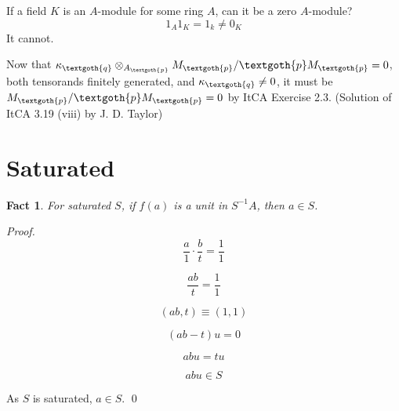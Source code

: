 \documentclass{article}
\newtheorem{theorem}{Fact}[section]
\begin{document}
If a field $K$ is an $A$-module for some ring $A$, can it be a zero $A$-module?
\[
 1_A 1_K = 1_k \ne 0_K
\]
It cannot.

Now that $\kappa_\textgoth{q} \otimes_{A_\textgoth{p}} M_\textgoth{p}/\textgoth{p}M_\textgoth{p} = 0$, both tensorands finitely generated, and $\kappa_\textgoth{q} \ne 0$, it must be $M_\textgoth{p}/\textgoth{p}M_\textgoth{p} = 0$ by ItCA Exercise 2.3. (Solution of ItCA 3.19 (viii) by J. D. Taylor)


\section{Saturated}

\begin{theorem}
For saturated $S$, if $f(a)$ is a unit in $S^{-1}A$, then $a \in S$.
\end{theorem}

\noindent
\textit{Proof.}
\[
  \frac{a}{1} \cdot \frac{b}{t} = \frac{1}{1} 
\]

\[
  \frac{ab}{t} = \frac{1}{1}
\]

\[
   (ab, t) \equiv (1, 1)
\]
 
\[
   (ab - t)u = 0
\]

\[
   abu = tu
\]

\[
   abu \in S
\]

As \( S \) is saturated, \( a \in S \).  \qed
\end{document}
